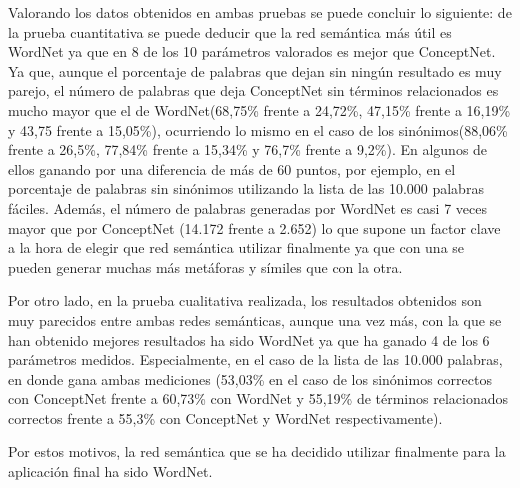 Valorando los datos obtenidos en ambas pruebas se puede concluir lo siguiente: de la prueba cuantitativa se puede deducir que la red semántica más útil es WordNet ya que en 8 de los 10 parámetros valorados es mejor que ConceptNet. Ya que, aunque el porcentaje de palabras que dejan sin ningún resultado es muy parejo, el número de palabras que deja ConceptNet sin términos relacionados es mucho mayor que el de WordNet(68,75\% frente a 24,72\%, 47,15\% frente a 16,19\% y 43,75 frente a 15,05\%), ocurriendo lo mismo en el caso de los sinónimos(88,06\% frente a 26,5\%, 77,84\% frente a 15,34\% y 76,7\% frente a 9,2\%). En algunos de ellos ganando por una diferencia de más de 60 puntos, por ejemplo, en el porcentaje de palabras sin sinónimos utilizando la lista de las 10.000 palabras fáciles. Además, el número de palabras generadas por WordNet es casi 7 veces mayor que por ConceptNet (14.172 frente a 2.652) lo que supone un factor clave a la hora de elegir que red semántica utilizar finalmente ya que con una se pueden generar muchas más metáforas y símiles que con la otra.

Por otro lado, en la prueba cualitativa realizada, los resultados obtenidos son muy parecidos entre ambas redes semánticas, aunque una vez más, con la que se han obtenido mejores resultados ha sido WordNet ya que ha ganado 4 de los 6 parámetros medidos. Especialmente, en el caso de la lista de las 10.000 palabras, en donde gana ambas mediciones (53,03\% en el caso de los sinónimos correctos con ConceptNet frente a 60,73\% con WordNet y 55,19\% de términos relacionados correctos frente a 55,3\% con ConceptNet y WordNet respectivamente).

Por estos motivos, la red semántica que se ha decidido utilizar finalmente para la aplicación final ha sido WordNet.


